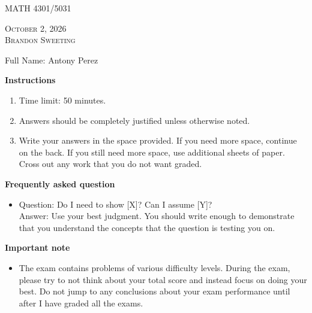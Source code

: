 \documentclass[11pt,addpoints]{exam}
\begin{document}
\noindent
\begin{minipage}[b]{0.72\textwidth}
MATH 4301/5031 
\end{minipage}%
\begin{minipage}[b]{0.28\textwidth}
\raggedleft\small\textsc{October 2, 2026}\\
\textsc{Brandon Sweeting}
\end{minipage}

\vspace{1.5em}
\noindent Full Name: Antony Perez

\vspace{1em}
\noindent\textbf{Instructions}
\begin{enumerate}
  \item Time limit: 50 minutes.
  \item Answers should be completely justified unless otherwise noted.
  \item Write your answers in the space provided. If you need more space, continue on the back. If you still need more space, use additional sheets of paper. Cross out any work that you do not want graded.
\end{enumerate}

\noindent\textbf{Frequently asked question}
\begin{itemize}
  \item Question: Do I need to show [X]? Can I assume [Y]?\\
  Answer: Use your best judgment. You should write enough to demonstrate that you understand the concepts that the question is testing you on.
\end{itemize}

\noindent\textbf{Important note}
\begin{itemize}
  \item The exam contains problems of various difficulty levels. During the exam, please try to not think about your total score and instead focus on doing your best. Do not jump to any conclusions about your exam performance until after I have graded all the exams.
\end{itemize}

\begin{center}
\gradetable[h][questions]
\end{center}
\end{document}
